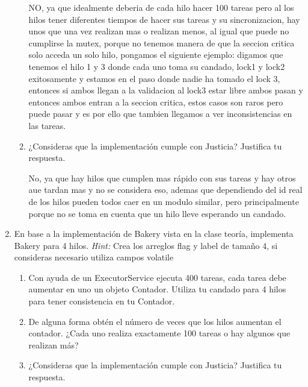 \begin{enumerate}
\begin{enumerate}
        NO, ya que idealmente deberia de cada hilo hacer 100 tareas pero al los hilos tener diferentes tiempos de hacer sus tareas y su sincronizacion, hay unos que una vez realizan mas o realizan menos, al igual que puede no cumplirse la mutex, porque no tenemos manera de que la seccion critica solo acceda un solo hilo, pongamos el siguiente ejemplo: digamos que tenemos el hilo 1 y 3 donde cada uno toma su candado, lock1 y lock2 exitosamente y estamos en el paso donde nadie ha tomado el lock 3, entonces si ambos llegan a la validacion al lock3 estar libre ambos pasan y entonces ambos entran a la seccion critica, estos casos son raros pero puede pasar y es por ello que tambien llegamos a ver inconsistencias en las tareas.\\


        \item ¿Consideras que la implementación cumple con Justicia? Justifica tu respuesta.

        No, ya que hay hilos que cumplen mas rápido con sus tareas y hay otros aue tardan mas y no se considera eso, ademas que dependiendo del id real de los hilos pueden todos caer en un modulo similar, pero principalmente porque no se toma en cuenta que un hilo lleve esperando un candado.\\
        
    \end{enumerate}

    \hfill

    \item  En base a la implementación de Bakery vista en la clase teoría, implementa Bakery para 4 hilos. \textit{Hint:} Crea los arreglos flag y label de tamaño 4, si consideras necesario utiliza campos volatile

    \begin{enumerate}
        \item Con ayuda de un ExecutorService ejecuta 400 tareas, cada tarea debe aumentar en uno un objeto Contador. Utiliza tu candado para 4 hilos para tener consistencia en tu Contador.

        \item De alguna forma obtén el número de veces que los hilos aumentan el contador. ¿Cada uno realiza exactamente 100 tareas o hay algunos que realizan más?

        \item ¿Consideras que la implementación cumple con Justicia? Justifica tu respuesta.
    \end{enumerate}


\end{enumerate}

